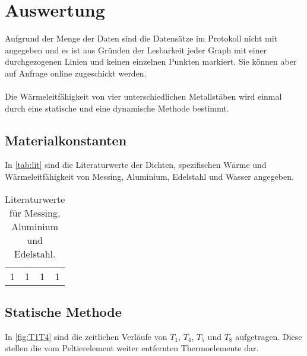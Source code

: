\section{Auswertung}
\label{sec:Auswertung}
Aufgrund der Menge der Daten sind die Datensätze im Protokoll nicht mit angegeben und es ist aus Gründen der Lesbarkeit jeder Graph mit einer durchgezogenen Linien
und keinen einzelnen Punkten markiert.
Sie können aber auf Anfrage online zugeschickt werden.\\
\\
Die Wärmeleitfähigkeit von vier unterschiedlichen Metallstäben wird einmal durch eine statische und
eine dynamische Methode bestimmt.

\subsection{Materialkonstanten}
\label{sec:material}
In \autoref{tab:lit} sind die Literaturwerte der Dichten, spezifischen Wärme und Wärmeleitfähigkeit von Messing, Aluminium, Edelstahl und Wasser angegeben.
\begin{table}
  \centering
  \caption{Literaturwerte für Messing, Aluminium und Edelstahl.}
  \label{tab:lit}
  \begin{tabular}{c c c c}
    1 & 1 & 1 & 1 \\
  \end{tabular}
\end{table} 

\subsection{Statische Methode}
\label{sec:stat}

In \autoref{fig:T1T4} sind die zeitlichen Verläufe von $T_1$, $T_4$, $T_5$ und $T_8$ aufgetragen. Diese stellen die vom Peltierelement weiter
entfernten Thermoelemente dar.

